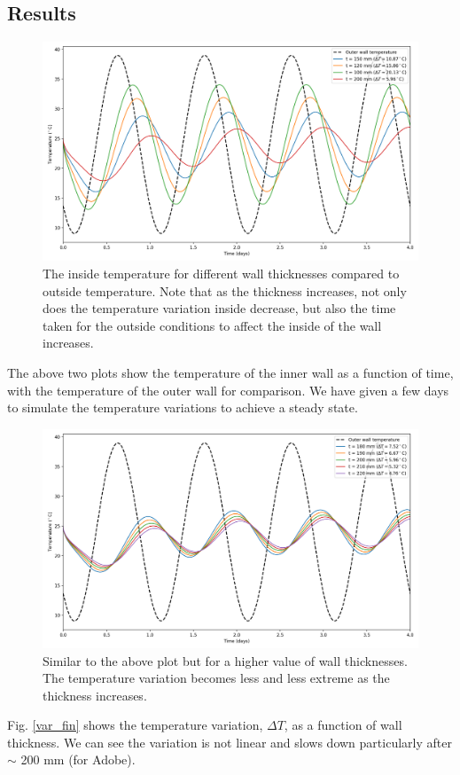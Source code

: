 \subsection{Results}
\begin{figure}[H]
    \centering
    \includegraphics[width=0.7\linewidth]{Figures/4/var0.png}
    \caption{The inside temperature for different wall thicknesses compared to outside temperature. Note that as the thickness increases, not only does the temperature variation inside decrease, but also the time taken for the outside conditions to affect the inside of the wall increases.}
    \label{var0}
\end{figure}

The above two plots show the temperature of the inner wall as a function of time, with the temperature of the outer wall for comparison. We have given a few days to simulate the temperature variations to achieve a steady state. 
\begin{figure}[H]
    \centering
    \includegraphics[width=0.7\linewidth]{Figures/4/var1.png}
    \caption{Similar to the above plot but for a higher value of wall thicknesses. The temperature variation becomes less and less extreme as the thickness increases.}
    \label{var2}
\end{figure}

Fig. \ref{var_fin} shows the temperature variation, $\Delta T$, as a function of wall thickness. We can see the variation is not linear and slows down particularly after $\sim$ 200 mm (for Adobe).  

